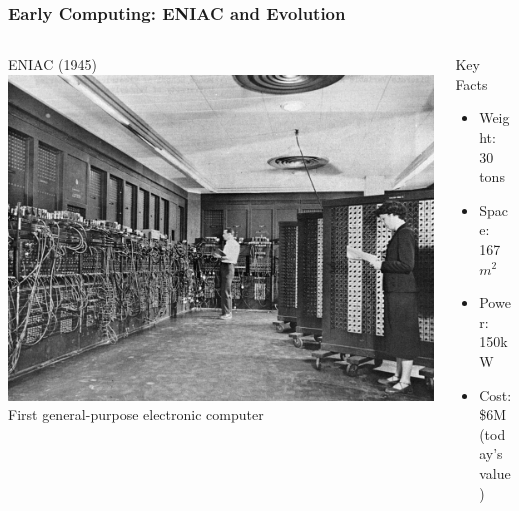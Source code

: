 \documentclass[aspectratio=169,t,xcolor=table]{beamer}
\begin{document}
\begin{frame}
    \frametitle{Early Computing: ENIAC and Evolution}
    
    \begin{columns}[t]
        \begin{column}{0.45\textwidth}
            \begin{block}{ENIAC (1945)}
                \centering
                \includegraphics[width=\textwidth]{figs/eniac.jpg}
                \small{First general-purpose electronic computer}
            \end{block}
            
            \vspace{-0.2cm}
            
        \end{column}
        
        \begin{column}{0.5\textwidth}
            \begin{alertblock}{Key Facts}
                \small
                \begin{itemize}\setlength{\itemsep}{0pt}
                    \item Weight: 30 tons
                    \item Space: 167 $m^2$ 
                    \item Power: 150kW
                    \item Cost: \$6M (today's value)
                \end{itemize}
            \end{alertblock}
            
        \end{column}
    \end{columns}
\end{frame}
\end{document}
